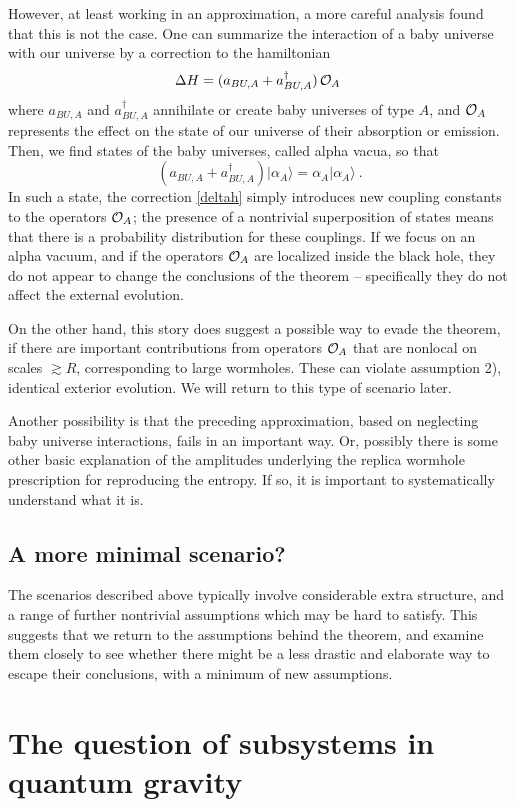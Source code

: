 \documentclass[12pt]{article}
\numberwithin{equation}{section}
\newcommand{\calo}{{\cal O}}
\newcommand{\beq}{\begin{equation}}
\newcommand{\eeq}{\end{equation}}
\begin{document}
However, at least working in an approximation, a more careful analysis\cite{Cole,GiStinc} found that this is not the case.  One can summarize the interaction of a baby universe with our universe by a correction to the hamiltonian
\beq\label{deltah}
\Delta H = (a_{BU,A}+a_{BU,A}^\dagger) \, {\cal O}_A\ 
\eeq
where $a_{BU,A}$ and $a_{BU,A}^\dagger$ annihilate or create baby universes of type $A$, and $\calo_A$ represents the effect on the state of our universe of their absorption or emission.  Then, we find states of the baby universes, called alpha vacua, so that
\beq
(a_{BU,A}+a_{BU,A}^\dagger)|\alpha_A\rangle=\alpha_A|\alpha_A\rangle\ .
\eeq
In such a state, the correction \eqref{deltah} simply introduces new coupling constants to the operators $\calo_A$; the presence of a nontrivial superposition of states means that there is a probability distribution for these couplings.  If we focus on an alpha vacuum, and if the operators $\calo_A$ are localized inside the black hole, they do not appear to change the conclusions of the theorem -- specifically they do not affect the external evolution.  

On the other hand, this story does suggest a possible way to evade the theorem, if there are important contributions from operators $\calo_A$ that are nonlocal on scales $\gtrsim R$, corresponding to large wormholes.  These can violate assumption 2), identical exterior evolution.  We will return to this type of scenario later.

Another possibility is that the preceding approximation, based on neglecting baby universe interactions, fails in an important way.  Or, possibly there is some other basic explanation of the amplitudes underlying the replica wormhole prescription for reproducing the entropy.  If so, it is important to systematically understand what it is.

\subsection{A more minimal scenario?}

The scenarios described above typically involve considerable extra structure, and a range of further nontrivial assumptions which may be hard to satisfy.  This suggests that we return to the assumptions behind the theorem, and examine them closely to see whether there might be a less drastic and elaborate way to escape their conclusions, with a minimum of new assumptions.

\section{The question of subsystems in quantum gravity}
\end{document}
